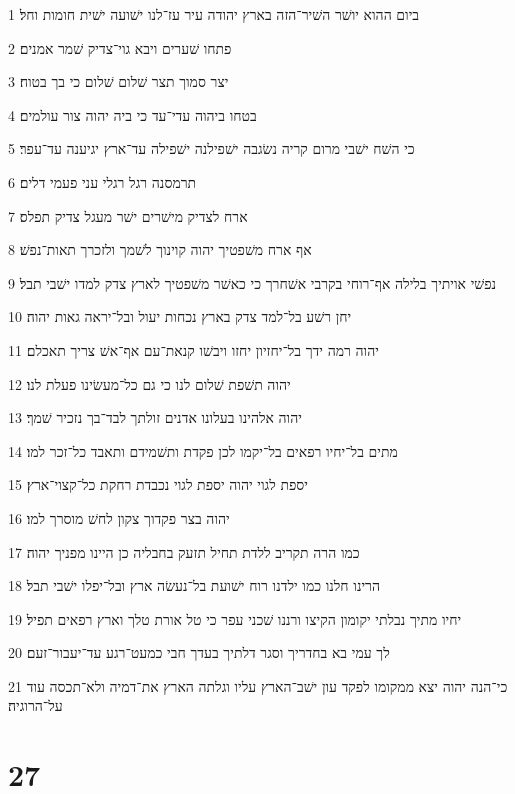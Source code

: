 \par 1 ביום ההוא יושׁר השׁיר־הזה בארץ יהודה עיר עז־לנו ישׁועה ישׁית חומות וחל׃
\par 2 פתחו שׁערים ויבא גוי־צדיק שׁמר אמנים׃
\par 3 יצר סמוך תצר שׁלום שׁלום כי בך בטוח׃
\par 4 בטחו ביהוה עדי־עד כי ביה יהוה צור עולמים׃
\par 5 כי השׁח ישׁבי מרום קריה נשׂגבה ישׁפילנה ישׁפילה עד־ארץ יגיענה עד־עפר׃
\par 6 תרמסנה רגל רגלי עני פעמי דלים׃
\par 7 ארח לצדיק מישׁרים ישׁר מעגל צדיק תפלס׃
\par 8 אף ארח משׁפטיך יהוה קוינוך לשׁמך ולזכרך תאות־נפשׁ׃
\par 9 נפשׁי אויתיך בלילה אף־רוחי בקרבי אשׁחרך כי כאשׁר משׁפטיך לארץ צדק למדו ישׁבי תבל׃
\par 10 יחן רשׁע בל־למד צדק בארץ נכחות יעול ובל־יראה גאות יהוה׃
\par 11 יהוה רמה ידך בל־יחזיון יחזו ויבשׁו קנאת־עם אף־אשׁ צריך תאכלם׃
\par 12 יהוה תשׁפת שׁלום לנו כי גם כל־מעשׂינו פעלת לנו׃
\par 13 יהוה אלהינו בעלונו אדנים זולתך לבד־בך נזכיר שׁמך׃
\par 14 מתים בל־יחיו רפאים בל־יקמו לכן פקדת ותשׁמידם ותאבד כל־זכר למו׃
\par 15 יספת לגוי יהוה יספת לגוי נכבדת רחקת כל־קצוי־ארץ׃
\par 16 יהוה בצר פקדוך צקון לחשׁ מוסרך למו׃
\par 17 כמו הרה תקריב ללדת תחיל תזעק בחבליה כן היינו מפניך יהוה׃
\par 18 הרינו חלנו כמו ילדנו רוח ישׁועת בל־נעשׂה ארץ ובל־יפלו ישׁבי תבל׃
\par 19 יחיו מתיך נבלתי יקומון הקיצו ורננו שׁכני עפר כי טל אורת טלך וארץ רפאים תפיל׃
\par 20 לך עמי בא בחדריך וסגר דלתיך בעדך חבי כמעט־רגע עד־יעבור־זעם׃
\par 21 כי־הנה יהוה יצא ממקומו לפקד עון ישׁב־הארץ עליו וגלתה הארץ את־דמיה ולא־תכסה עוד על־הרוגיה׃

\chapter{27}

